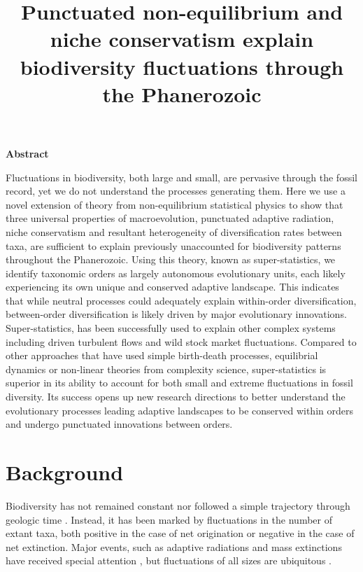 \documentclass[11pt]{article}
\title{Punctuated non-equilibrium and niche conservatism explain
  biodiversity fluctuations through the Phanerozoic}
\begin{document}
\noindent
\textbf{Abstract}
\vspace{\baselineskip}

\noindent
Fluctuations in biodiversity, both large and small, are pervasive
through the fossil record, yet we do not understand the processes
generating them.
% 
Here we use a novel extension of theory from non-equilibrium
statistical physics to show that three universal properties of
macroevolution, punctuated adaptive radiation, niche conservatism and
resultant heterogeneity of diversification rates between taxa, are
sufficient to explain previously unaccounted for biodiversity patterns
throughout the Phanerozoic.
% 
Using this theory, known as super-statistics, we identify taxonomic
orders as largely autonomous evolutionary units, each likely
experiencing its own unique and conserved adaptive landscape.  This
indicates that while neutral processes could adequately explain
within-order diversification, between-order diversification is likely
driven by major evolutionary innovations.
% 
Super-statistics, has been successfully used to explain other
complex systems including driven turbulent flows and wild stock market
fluctuations.
% 
Compared to other approaches that have used simple birth-death
processes, equilibrial dynamics or non-linear theories from complexity
science, super-statistics is superior in its ability to account for
both small and extreme fluctuations in fossil diversity.
% 
Its success opens up new research directions to better understand
the evolutionary processes leading adaptive landscapes to be conserved
within orders and undergo punctuated innovations between orders.

\clearpage

\section{Background}
Biodiversity has not remained constant nor followed a simple
trajectory through geologic time \citep{raup1982, sepkoski1984,
  gilinsky1994, liow2007, alroy08, alroy2010}.  Instead, it has been
marked by fluctuations in the number of extant taxa, both positive in
the case of net origination or negative in the case of net
extinction. Major events, such as adaptive radiations and mass
extinctions have received special attention \citep{benton1995,
  Erwin1998}, but fluctuations of all sizes are ubiquitous
\citep{sepkoski1984, alroy08, quental2013}.
\end{document}
